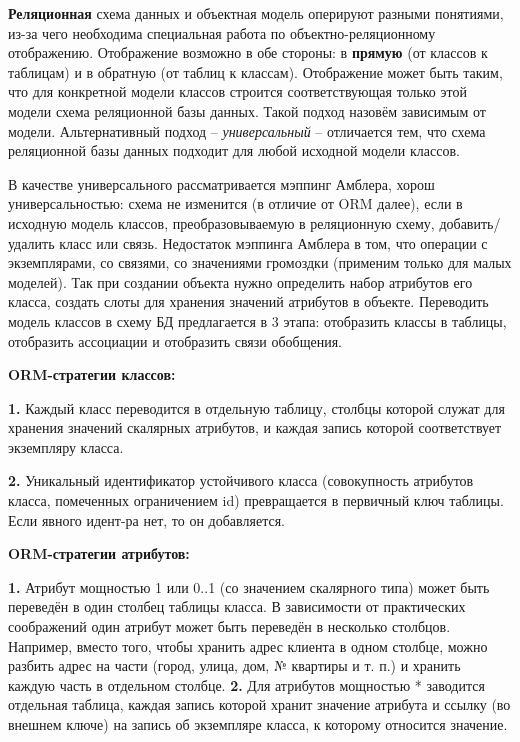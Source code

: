 
\textbf{Реляционная} схема данных и объектная модель оперируют разными понятиями, из-за чего необходима специальная работа по объектно-реляционному отображению. Отображение возможно в обе стороны: в \textbf{прямую} (от классов к таблицам) и в обратную (от таблиц к классам). Отображение может быть таким, что для конкретной модели классов строится соответствующая только этой модели схема реляционной базы данных. Такой подход назовём зависимым от модели. Альтернативный подход – \textit{универсальный} – отличается тем, что схема реляционной базы данных подходит для любой исходной модели классов.

В качестве универсального рассматривается мэппинг Амблера, хорош универсальностью: схема не изменится (в отличие от ORM далее), если в исходную модель классов, преобразовываемую в реляционную схему, добавить/удалить класс или связь. Недостаток мэппинга Амблера в том, что операции с экземплярами, со связями, со значениями громоздки (применим только для малых моделей). Так при создании объекта нужно определить набор атрибутов его класса, создать слоты для хранения значений атрибутов в объекте. 
Переводить модель классов в схему БД предлагается в 3 этапа: отобразить классы в таблицы, отобразить ассоциации и отобразить связи обобщения. 

\textbf{ORM-стратегии классов:}

\textbf{1.} Каждый класс переводится в отдельную таблицу, столбцы которой служат для хранения значений
скалярных атрибутов, и каждая запись которой соответствует экземпляру класса. 

\textbf{2.} Уникальный идентификатор устойчивого класса (совокупность атрибутов класса, помеченных ограничением {id}) превращается в первичный ключ таблицы. Если явного идент-ра нет, то он добавляется.

\textbf{ORM-стратегии атрибутов:} 

\textbf{1.} Атрибут мощностью 1 или 0..1 (со значением скалярного типа) может быть переведён в один столбец таблицы класса. В зависимости от практических соображений один атрибут может быть переведён в несколько столбцов. Например, вместо того, чтобы хранить адрес клиента в одном столбце, можно разбить адрес на части (город, улица, дом, № квартиры и т. п.) и хранить каждую часть в отдельном столбце. \textbf{2.} Для атрибутов мощностью * заводится отдельная таблица, каждая запись которой хранит значение атрибута и ссылку (во внешнем ключе) на запись об экземпляре класса, к которому относится значение. 

